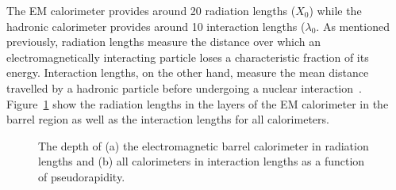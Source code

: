 The \ac{EM} calorimeter provides around 20 radiation lengths ($X_0$) while the hadronic calorimeter provides around 10 interaction lengths ($\lambda_0$. 
As mentioned previously, radiation lengths measure the distance over which an electromagnetically interacting particle loses a characteristic fraction of its energy.
Interaction lengths, on the other hand, measure the mean distance travelled by a hadronic particle before undergoing a nuclear interaction~\cite{pdg}.
Figure~\ref{fig:calo_interactionlengths} show the radiation lengths in the layers of the \ac{EM} calorimeter in the barrel region as well as the interaction lengths for all calorimeters.


\begin{figure}[hbtp]
\caption{The depth of (a) the electromagnetic barrel calorimeter in radiation lengths and (b) all calorimeters in interaction lengths as a function of pseudorapidity.}
\label{fig:calo_interactionlengths}
\end{figure}

